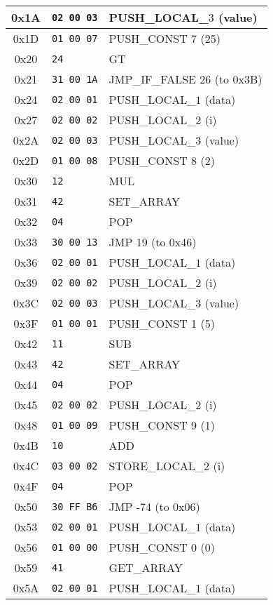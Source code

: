 \documentclass[a4paper,12pt]{article}
\begin{document}
\begin{longtable}{|c|l|p{6cm}|}
  0x1A & \texttt{02 00 03} & PUSH\_LOCAL\_$3$ (value) \\ \hline
  0x1D & \texttt{01 00 07} & PUSH\_CONST 7 (25) \\ \hline
  0x20 & \texttt{24} & GT \\ \hline
  0x21 & \texttt{31 00 1A} & JMP\_IF\_FALSE 26 (to 0x3B) \\ \hline
  0x24 & \texttt{02 00 01} & PUSH\_LOCAL\_$1$ (data) \\ \hline
  0x27 & \texttt{02 00 02} & PUSH\_LOCAL\_$2$ (i) \\ \hline
  0x2A & \texttt{02 00 03} & PUSH\_LOCAL\_$3$ (value) \\ \hline
  0x2D & \texttt{01 00 08} & PUSH\_CONST 8 (2) \\ \hline
  0x30 & \texttt{12} & MUL \\ \hline
  0x31 & \texttt{42} & SET\_ARRAY \\ \hline
  0x32 & \texttt{04} & POP \\ \hline
  0x33 & \texttt{30 00 13} & JMP 19 (to 0x46) \\ \hline
  0x36 & \texttt{02 00 01} & PUSH\_LOCAL\_$1$ (data) \\ \hline
  0x39 & \texttt{02 00 02} & PUSH\_LOCAL\_$2$ (i) \\ \hline
  0x3C & \texttt{02 00 03} & PUSH\_LOCAL\_$3$ (value) \\ \hline
  0x3F & \texttt{01 00 01} & PUSH\_CONST 1 (5) \\ \hline
  0x42 & \texttt{11} & SUB \\ \hline
  0x43 & \texttt{42} & SET\_ARRAY \\ \hline
  0x44 & \texttt{04} & POP \\ \hline
  0x45 & \texttt{02 00 02} & PUSH\_LOCAL\_$2$ (i) \\ \hline
  0x48 & \texttt{01 00 09} & PUSH\_CONST 9 (1) \\ \hline
  0x4B & \texttt{10} & ADD \\ \hline
  0x4C & \texttt{03 00 02} & STORE\_LOCAL\_$2$ (i) \\ \hline
  0x4F & \texttt{04} & POP \\ \hline
  0x50 & \texttt{30 FF B6} & JMP -74 (to 0x06) \\ \hline
  0x53 & \texttt{02 00 01} & PUSH\_LOCAL\_$1$ (data) \\ \hline
  0x56 & \texttt{01 00 00} & PUSH\_CONST 0 (0) \\ \hline
  0x59 & \texttt{41} & GET\_ARRAY \\ \hline
  0x5A & \texttt{02 00 01} & PUSH\_LOCAL\_$1$ (data) \\ \hline

\end{longtable}
\end{document}
